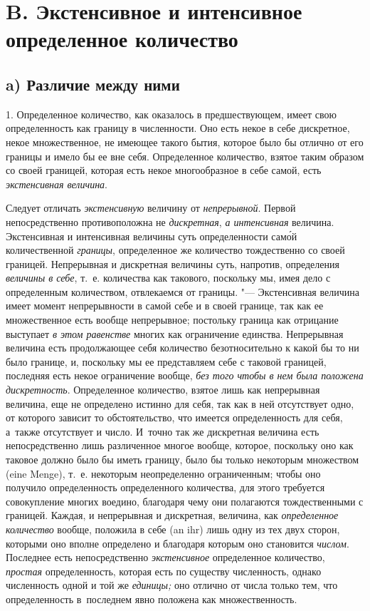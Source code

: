 \section[B. Экстенсивное и интенсивное определенное количество]%
{B. Экстенсивное и интенсивное определенное количество}

\subsection[a) Различие между ними]{a) Различие между ними}

1. Определенное количество, как оказалось в предшествующем, имеет свою
определенность как границу в численности. Оно есть некое в себе дискретное,
некое множественное, не имеющее такого бытия, которое было бы отлично от его
границы и имело бы ее вне себя. Определенное количество, взятое таким образом
со своей границей, которая есть некое многообразное в себе самой, есть
{\em экстенсивная величина}.

Следует отличать {\em экстенсивную} величину от {\em непрерывной}. Первой
непосредственно противоположна не {\em дискретная}, {\em а интенсивная}
величина. Экстенсивная и интенсивная величины суть определенности сам\'{о}й
количественной {\em границы}, определенное же количество тождественно со своей
границей. Непрерывная и дискретная величины суть, напротив, определения
{\em величины в себе}, т.~е. количества как такового, поскольку мы, имея дело
с определенным количеством, отвлекаемся от границы. "--- Экстенсивная величина
имеет момент непрерывности в самой себе и в своей границе, так как ее
множественное есть вообще непрерывное; постольку граница как отрицание
выступает {\em в этом равенстве} многих как ограничение единства. Непрерывная
величина есть продолжающее себя количество безотносительно к какой бы то ни
было границе, и, поскольку мы ее представляем себе с таковой границей,
последняя есть некое ограничение вообще, {\em без того чтобы в нем была
положена дискретность}. Определенное количество, взятое лишь как непрерывная
величина, еще не определено истинно для себя, так как в ней отсутствует одно,
от которого зависит то обстоятельство, что имеется определенность для себя,
а~также отсутствует и число. И~точно так же дискретная величина есть
непосредственно лишь различенное многое вообще, которое, поскольку оно как
таковое должно было бы иметь границу, было бы только некоторым множеством (eine
Men\-ge), т.~е. некоторым неопределенно ограниченным; чтобы оно получило
определенность определенного количества, для этого требуется совокупление
многих воедино, благодаря чему они полагаются тождественными с границей.
Каждая, и непрерывная и дискретная, величина, как {\em определенное количество}
вообще, положила в себе (an ihr) лишь одну из тех двух сторон, которыми оно
вполне определено и благодаря которым оно становится {\em числом}. Последнее
есть непосредственно {\em экстенсивное} определенное количество, {\em простая}
определенность, которая есть по существу численность, однако численность одной
и той же {\em единицы;} оно отлично от числа только тем, что определенность
в~последнем явно положена как множественность.

